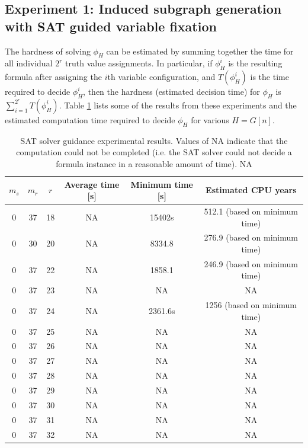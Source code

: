 \documentclass[paper=a4, fontsize=11pt]{scrartcl} %
\begin{document}
\subsection{Experiment 1: Induced subgraph generation with SAT guided variable fixation}
The hardness of solving $\phi_H$ can be estimated by summing together the time for
all individual $2^r$ truth value assignments. In particular, if $\phi_H^i$ is the
resulting formula after assigning the $i$th variable configuration, and $T(\phi_H^i)$ 
is the time required to decide $\phi_H^i$, then the hardness (estimated decision time)
for $\phi_H$ is $\sum_{i = 1}^{2^r} T(\phi_H^i)$. Table \ref{tab:guidanceExperiment}
lists some of the results from these experiments and the estimated computation time
required to decide $\phi_H$ for various $H = G[n]$.

\begin{table}
	\caption{SAT solver guidance experimental results. Values of NA indicate that the computation
	could not be completed (i.e. the SAT solver could not decide a formula instance in a reasonable
	amount of time). NA}
	\begin{tabular}{c | c | c | c | c | c}
		\hline
		$m_s$ & $m_r$ & $r$ & Average time [s] & Minimum time [s] & Estimated CPU years\\ \hline
		0 & 37 & 18 & NA & 15402s & 512.1 (based on minimum time) \\ \hline
		0 & 30 & 20 & NA & 8334.8 & 276.9 (based on minimum time) \\ \hline
		0 & 37 & 22 & NA & 1858.1 & 246.9 (based on minimum time) \\ \hline
		0 & 37 & 23 & NA & NA & NA \\ \hline
		0 & 37 & 24 & NA & 2361.6s & 1256 (based on minimum time) \\ \hline
		0 & 37 & 25 & NA & NA & NA \\ \hline
		0 & 37 & 26 & NA & NA & NA \\ \hline
		0 & 37 & 27 & NA & NA & NA \\ \hline
		0 & 37 & 28 & NA & NA & NA \\ \hline
		0 & 37 & 29 & NA & NA & NA \\ \hline
		0 & 37 & 30 & NA & NA & NA \\ \hline
		0 & 37 & 31 & NA & NA & NA \\ \hline
		0 & 37 & 32 & NA & NA & NA \\ 
		\hline
	\end{tabular}
	\label{tab:guidanceExperiment}
\end{table}
\end{document}
